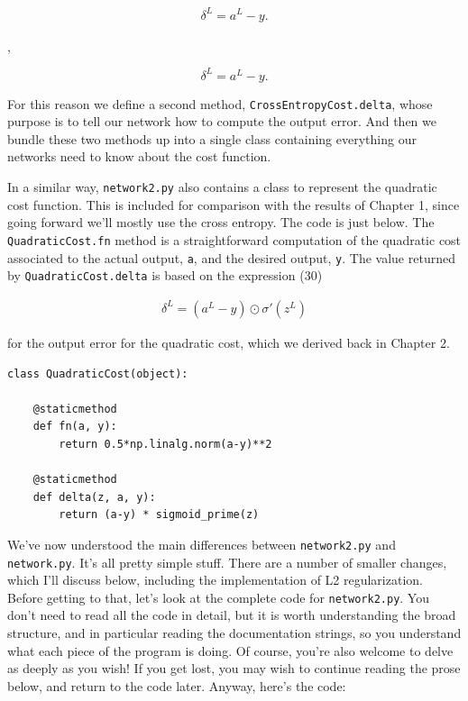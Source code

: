 \begin{align*}
\delta^L = a^L-y. \nonumber
\end{align*}

\noindent,

\begin{equation}
\delta^L = a^L-y.
\tag{99}
\end{equation}

\noindent For this reason we define a second method, \texttt{CrossEntropyCost.delta}, whose purpose is to tell our network how to compute the output error. And then we bundle these two methods up into a single class containing everything our networks need to know about the cost function.


In a similar way, \texttt{network2.py} also contains a class to represent the quadratic cost function. This is included for comparison with the results of Chapter 1, since going forward we'll mostly use the cross entropy. The code is just below. The \texttt{QuadraticCost.fn} method is a straightforward computation of the quadratic cost associated to the actual output, \texttt{a}, and the desired output, \texttt{y}. The value returned by \texttt{QuadraticCost.delta} is based on the expression (30)

\begin{align*}
\delta^L = (a^L-y) \odot \sigma'(z^L) \nonumber
\end{align*}

\noindent for the output error for the quadratic cost, which we derived back in Chapter 2.



\begin{lstlisting}
class QuadraticCost(object):

    @staticmethod
    def fn(a, y):
        return 0.5*np.linalg.norm(a-y)**2

    @staticmethod
    def delta(z, a, y):
        return (a-y) * sigmoid_prime(z)

\end{lstlisting}


We've now understood the main differences between \texttt{network2.py} and \texttt{network.py}. It's all pretty simple stuff. There are a number of smaller changes, which I'll discuss below, including the implementation of L2 regularization. Before getting to that, let's look at the complete code for \texttt{network2.py}. You don't need to read all the code in detail, but it is worth understanding the broad structure, and in particular reading the documentation strings, so you understand what each piece of the program is doing. Of course, you're also welcome to delve as deeply as you wish! If you get lost, you may wish to continue reading the prose below, and return to the code later. Anyway, here's the code:



